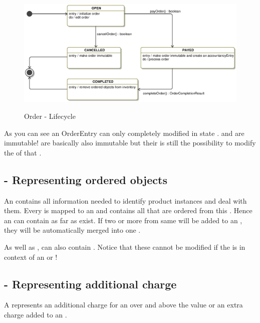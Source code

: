 \begin{figure}[ht]
	\centering
  \includegraphics[width=1.0\textwidth]{images/Order_StateMachine.eps}
	\label{order_statemachine}
	\caption{Order - Lifecycle}
\end{figure}  

As you can see an OrderEntry can only completely modified in state .  and   are immutable!   are basically also immutable but their is still the possibility to modify the  of that . 

\subsection{ - Representing ordered objects}
An  contains all information needed to identify product instances and deal with them. Every  is mapped to an  and contains all  that are ordered from this . Hence an  can contain as far  as  exist. If two or more  from same  will be added to an , they will be automatically merged into one .

As well as ,  can also contain . Notice that these  cannot be modified if the  is in context of an  or  ! 

\subsection{ - Representing additional charge}
A  represents an additional charge for an  over and above the  value or an extra charge added to an .

